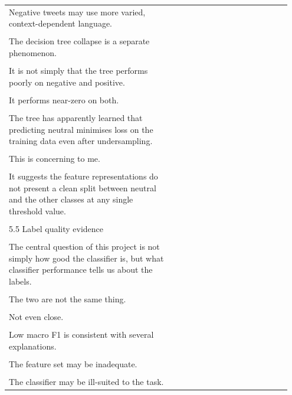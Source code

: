 \documentclass[11pt]{article}
\begin{document}
\begin{longtable}{|p{0.55\linewidth}|p{0.40\linewidth}|}
\hline
\rule{0pt}{3.5cm} & \\
\hline
Negative tweets may use more varied, context-dependent language. & \\[2pt]
\hline
\rule{0pt}{3.5cm} & \\
\hline
The decision tree collapse is a separate phenomenon. & \\[2pt]
\hline
\rule{0pt}{3.5cm} & \\
\hline
It is not simply that the tree performs poorly on negative and positive. & \\[2pt]
\hline
\rule{0pt}{3.5cm} & \\
\hline
It performs near-zero on both. & \\[2pt]
\hline
\rule{0pt}{3.5cm} & \\
\hline
The tree has apparently learned that predicting neutral minimises loss on the training data even after undersampling. & \\[2pt]
\hline
\rule{0pt}{3.5cm} & \\
\hline
This is concerning to me. & \\[2pt]
\hline
\rule{0pt}{3.5cm} & \\
\hline
It suggests the feature representations do not present a clean split between neutral and the other classes at any single threshold value. & \\[2pt]
\hline
\rule{0pt}{3.5cm} & \\
\hline
5.5 Label quality evidence & \\[2pt]
\hline
\rule{0pt}{3.5cm} & \\
\hline
The central question of this project is not simply how good the classifier is, but what classifier performance tells us about the labels. & \\[2pt]
\hline
\rule{0pt}{3.5cm} & \\
\hline
The two are not the same thing. & \\[2pt]
\hline
\rule{0pt}{3.5cm} & \\
\hline
Not even close. & \\[2pt]
\hline
\rule{0pt}{3.5cm} & \\
\hline
Low macro F1 is consistent with several explanations. & \\[2pt]
\hline
\rule{0pt}{3.5cm} & \\
\hline
The feature set may be inadequate. & \\[2pt]
\hline
\rule{0pt}{3.5cm} & \\
\hline
The classifier may be ill-suited to the task. & \\[2pt]

\end{longtable}
\end{document}
